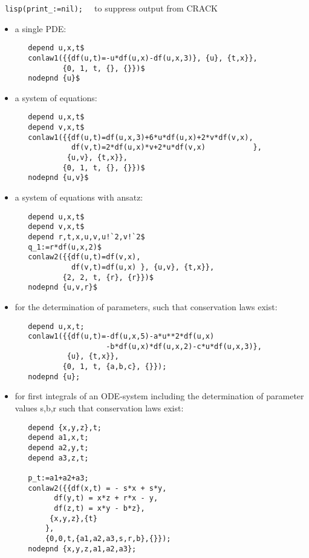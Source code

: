 \documentclass[12pt]{article}
\begin{document}
\verb+ lisp(print_:=nil);  +   to suppress output from CRACK 
\begin{itemize}
\item a single PDE:
\begin{verbatim}
   depend u,x,t$
   conlaw1({{df(u,t)=-u*df(u,x)-df(u,x,3)}, {u}, {t,x}},
           {0, 1, t, {}, {}})$
   nodepnd {u}$
\end{verbatim}

\item a system of equations:
\begin{verbatim}
   depend u,x,t$
   depend v,x,t$
   conlaw1({{df(u,t)=df(u,x,3)+6*u*df(u,x)+2*v*df(v,x),
             df(v,t)=2*df(u,x)*v+2*u*df(v,x)           }, 
            {u,v}, {t,x}},
           {0, 1, t, {}, {}})$
   nodepnd {u,v}$
\end{verbatim}

\item a system of equations with ansatz:
\begin{verbatim}
   depend u,x,t$
   depend v,x,t$
   depend r,t,x,u,v,u!`2,v!`2$
   q_1:=r*df(u,x,2)$
   conlaw2({{df(u,t)=df(v,x),
             df(v,t)=df(u,x) }, {u,v}, {t,x}},
           {2, 2, t, {r}, {r}})$
   nodepnd {u,v,r}$
\end{verbatim}

\item for the 
determination of parameters, such that conservation laws exist:
\begin{verbatim}
   depend u,x,t;
   conlaw1({{df(u,t)=-df(u,x,5)-a*u**2*df(u,x)
                     -b*df(u,x)*df(u,x,2)-c*u*df(u,x,3)}, 
            {u}, {t,x}},
           {0, 1, t, {a,b,c}, {}});
   nodepnd {u};
\end{verbatim}

\item for first integrals of an ODE-system including the determination of
parameter values s,b,r such that conservation laws exist:
\begin{verbatim}
   depend {x,y,z},t;
   depend a1,x,t;
   depend a2,y,t;
   depend a3,z,t;

   p_t:=a1+a2+a3;
   conlaw2({{df(x,t) = - s*x + s*y,
	     df(y,t) = x*z + r*x - y,
	     df(z,t) = x*y - b*z},
	    {x,y,z},{t}
	   },
	   {0,0,t,{a1,a2,a3,s,r,b},{}});
   nodepnd {x,y,z,a1,a2,a3};
\end{verbatim}

\end{itemize}
\end{document}
